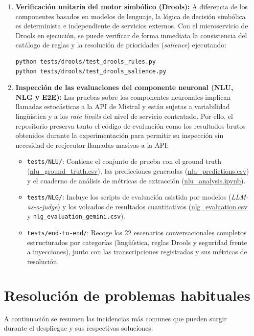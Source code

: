 \begin{enumerate}
    \item \textbf{Verificación unitaria del motor simbólico (Drools):}
    A diferencia de los componentes basados en modelos de lenguaje, la lógica de decisión simbólica es determinista e independiente de servicios externos. Con el microservicio de Drools en ejecución, se puede verificar de forma inmediata la consistencia del catálogo de reglas y la resolución de prioridades (\textit{salience}) ejecutando:
\begin{verbatim}
python tests/drools/test_drools_rules.py
python tests/drools/test_drools_salience.py
\end{verbatim}

    \item \textbf{Inspección de las evaluaciones del componente neuronal (NLU, NLG y E2E):}
    Las pruebas sobre los componentes neuronales implican llamadas estocásticas a la API de Mistral y están sujetas a variabilidad lingüística y a los \textit{rate limits} del nivel de servicio contratado. Por ello, el repositorio preserva tanto el código de evaluación como los resultados brutos obtenidos durante la experimentación para permitir su inspección sin necesidad de reejecutar llamadas masivas a la API:
    \begin{itemize}
        \item \texttt{tests/NLU/}: Contiene el conjunto de prueba con el ground truth (\url{nlu\_ground\_truth.csv}), las predicciones generadas (\url{nlu\_predictions.csv}) y el cuaderno de análisis de métricas de extracción (\url{nlu\_analysis.ipynb}).
        \item \texttt{tests/NLG/}: Incluye los scripts de evaluación asistida por modelos (\textit{LLM-as-a-judge}) y los volcados de resultados cuantitativos (\url{nlg\_evaluation.csv} y \texttt{nlg\_evaluation\_gemini.csv}).
        \item \texttt{tests/end-to-end/}: Recoge los 22 escenarios conversacionales completos estructurados por categorías (lingüística, reglas Drools y seguridad frente a inyecciones), junto con las transcripciones registradas y sus métricas de resolución.
    \end{itemize}
\end{enumerate}
\section{Resolución de problemas habituales}

A continuación se resumen las incidencias más comunes que pueden surgir durante el despliegue y sus respectivas soluciones:

